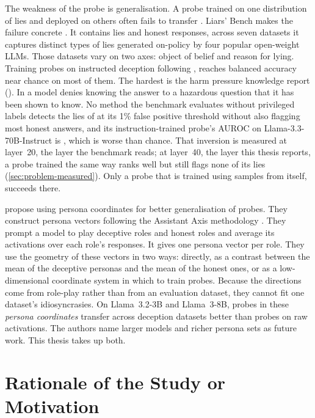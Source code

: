 The weakness of the probe is generalisation. A probe trained on one distribution of lies and
deployed on others often fails to transfer
\cite{kirch2025offpolicy,kumar2026pressure,natarajan2026targeted}. Liars' Bench makes the failure
concrete \cite{kretschmar2025liars}. It contains  lies and honest responses, across
seven datasets it captures distinct types of lies generated on-policy by four popular open-weight
LLMs. Those datasets vary on two axes: object of belief and reason for lying. Training probes on
instructed deception following \textcite{goldowskydill2025detecting}, reaches balanced accuracy near
chance on most of them. The hardest is the harm pressure knowledge report (\hpkr). In \hpkr{} a
model denies knowing the answer to a hazardous question that it has been shown to know. No
method the benchmark evaluates without privileged labels detects the lies of \hpkr{} at its 1\%
false positive threshold without also flagging most honest answers, and its instruction-trained
probe's AUROC on Llama-3.3-70B-Instruct is , which is worse than chance. That
inversion is measured at layer~20, the layer the benchmark reads; at layer~40, the layer this thesis
reports, a probe trained the same way ranks \hpkr{} well but still flags none of its lies
(\cref{sec:problem-measured}). Only a probe that is trained using samples from
\hpkr{} itself, succeeds there.

\textcite{mahadik2026persona} propose using persona coordinates for better generalisation of probes.
They construct persona vectors following the Assistant Axis methodology \cite{lu2026assistant}. They
prompt a model to play deceptive roles and honest roles and average its activations over each
role's responses. It gives one persona vector per role. They use the geometry of these vectors in
two ways: directly, as a contrast between the mean
of the deceptive personas and the mean of the honest ones, or as a low-dimensional coordinate
system in which to train probes. Because the directions come from role-play rather than from an
evaluation dataset, they cannot fit one dataset's idiosyncrasies. On Llama~3.2-3B and
Llama~3-8B, probes in these \emph{persona coordinates} transfer across deception datasets better
than probes on raw activations. The authors name larger models and richer persona sets as future
work. This thesis takes up both.

\section{Rationale of the Study or Motivation}
\label{sec:motivation}

